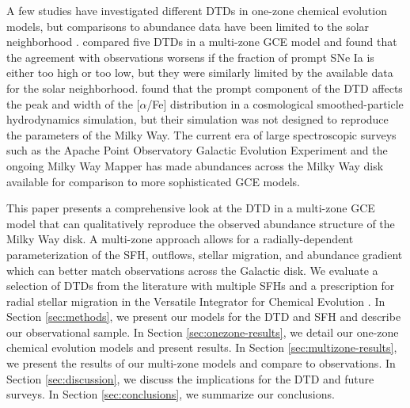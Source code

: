 \documentclass[twocolumn,twocolappendix,linenumbers]{aastex631}
\newcommand{\aFe}{[$\alpha$/Fe]\xspace}
\newcommand{\vice}{{\tt VICE}\xspace}
\begin{document}
A few studies have investigated different DTDs in one-zone chemical evolution models, but comparisons to abundance data have been limited to the solar neighborhood \citep[e.g.,][]{Andrews2017-ChemicalEvolution,Palicio2023-AnalyticDTD}. 
\citet{Matteucci2009-DTDModels} compared five DTDs in a multi-zone GCE model and found that the agreement with observations worsens if the fraction of prompt SNe Ia is either too high or too low, but they were similarly limited by the available data for the solar neighborhood.
\citet{Poulhazan2018-PrecisionPollution} found that the prompt component of the DTD affects the peak and width of the \aFe distribution in a cosmological smoothed-particle hydrodynamics simulation, but their simulation was not designed to reproduce the parameters of the Milky Way.
The current era of large spectroscopic surveys such as the Apache Point Observatory Galactic Evolution Experiment \citep[APOGEE;][]{Majewski2017-APOGEE} and the ongoing Milky Way Mapper \citep{Kollmeier2017-SDSS-V} has made abundances across the Milky Way disk available for comparison to more sophisticated GCE models.


This paper presents a comprehensive look at the DTD in a multi-zone GCE model that can qualitatively reproduce the observed abundance structure of the Milky Way disk. A multi-zone approach allows for a radially-dependent parameterization of the SFH, outflows, stellar migration, and abundance gradient which can better match observations across the Galactic disk. We evaluate a selection of DTDs from the literature with multiple SFHs and a prescription for radial stellar migration in the Versatile Integrator for Chemical Evolution \citep[\vice;][]{JohnsonWeinberg2020-Starbursts}. In Section \ref{sec:methods}, we present our models for the DTD and SFH and describe our observational sample. In Section \ref{sec:onezone-results}, we detail our one-zone chemical evolution models and present results. In Section \ref{sec:multizone-results}, we present the results of our multi-zone models and compare to observations. In Section \ref{sec:discussion}, we discuss the implications for the DTD and future surveys. In Section \ref{sec:conclusions}, we summarize our conclusions.
\end{document}
